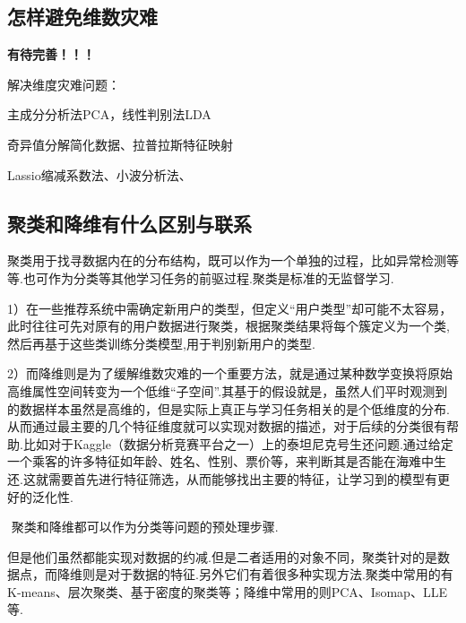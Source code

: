 \subsection{怎样避免维数灾难}\label{ux600eux6837ux907fux514dux7ef4ux6570ux707eux96be}

\textbf{有待完善！！！}

解决维度灾难问题：

主成分分析法PCA，线性判别法LDA

奇异值分解简化数据、拉普拉斯特征映射

Lassio缩减系数法、小波分析法、

\subsection{聚类和降维有什么区别与联系}\label{ux805aux7c7bux548cux964dux7ef4ux6709ux4ec0ux4e48ux533aux522bux4e0eux8054ux7cfb}

​
聚类用于找寻数据内在的分布结构，既可以作为一个单独的过程，比如异常检测等等.也可作为分类等其他学习任务的前驱过程.聚类是标准的无监督学习.

​
1）在一些推荐系统中需确定新用户的类型，但定义``用户类型''却可能不太容易，此时往往可先对原有的用户数据进行聚类，根据聚类结果将每个簇定义为一个类,然后再基于这些类训练分类模型,用于判别新用户的类型.

 

​
2）而降维则是为了缓解维数灾难的一个重要方法，就是通过某种数学变换将原始高维属性空间转变为一个低维``子空间''.其基于的假设就是，虽然人们平时观测到的数据样本虽然是高维的，但是实际上真正与学习任务相关的是个低维度的分布.从而通过最主要的几个特征维度就可以实现对数据的描述，对于后续的分类很有帮助.比如对于Kaggle（数据分析竞赛平台之一）上的泰坦尼克号生还问题.通过给定一个乘客的许多特征如年龄、姓名、性别、票价等，来判断其是否能在海难中生还.这就需要首先进行特征筛选，从而能够找出主要的特征，让学习到的模型有更好的泛化性.

​ 聚类和降维都可以作为分类等问题的预处理步骤.

 

​
但是他们虽然都能实现对数据的约减.但是二者适用的对象不同，聚类针对的是数据点，而降维则是对于数据的特征.另外它们有着很多种实现方法.聚类中常用的有K-means、层次聚类、基于密度的聚类等；降维中常用的则PCA、Isomap、LLE等.


